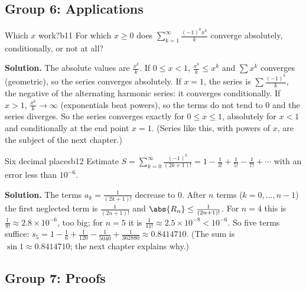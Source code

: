 \documentclass[11pt]{article}
\begin{document}
\subsection*{Group 6: Applications}

\begin{exmp}{Which $x$ work?}{b11}
For which $x\ge0$ does $\displaystyle\sum_{k=1}^\infty\frac{(-1)^kx^k}k$ converge absolutely, conditionally, or not at all?

\textbf{Solution.} The absolute values are $\frac{x^k}k$. If $0\le x<1$, $\frac{x^k}k\le x^k$ and $\sum x^k$ converges (geometric), so the series converges absolutely. If $x=1$, the series is $\sum\frac{(-1)^k}k$, the negative of the alternating harmonic series: it converges conditionally. If $x>1$, $\frac{x^k}k\to\infty$ (exponentials beat powers), so the terms do not tend to $0$ and the series diverges. So the series converges exactly for $0\le x\le1$, absolutely for $x<1$ and conditionally at the end point $x=1$. (Series like this, with powers of $x$, are the subject of the next chapter.)
\end{exmp}

\begin{exmp}{Six decimal places}{b12}
Estimate $S=\displaystyle\sum_{k=0}^\infty\frac{(-1)^k}{(2k+1)!}=1-\frac1{3!}+\frac1{5!}-\frac1{7!}+\cdots$ with an error less than $10^{-6}$.

\textbf{Solution.} The terms $a_k=\frac1{(2k+1)!}$ decrease to $0$. After $n$ terms ($k=0,\dots,n-1$) the first neglected term is $\frac1{(2n+1)!}$ and $\abs{R_n}\le\frac1{(2n+1)!}$. For $n=4$ this is $\frac1{9!}\approx2.8\times10^{-6}$, too big; for $n=5$ it is $\frac1{11!}\approx2.5\times10^{-8}<10^{-6}$. So five terms suffice: $s_5=1-\frac16+\frac1{120}-\frac1{5040}+\frac1{362880}\approx0.8414710$. (The sum is $\sin1\approx0.8414710$; the next chapter explains why.)
\end{exmp}

\subsection*{Group 7: Proofs}
\end{document}
